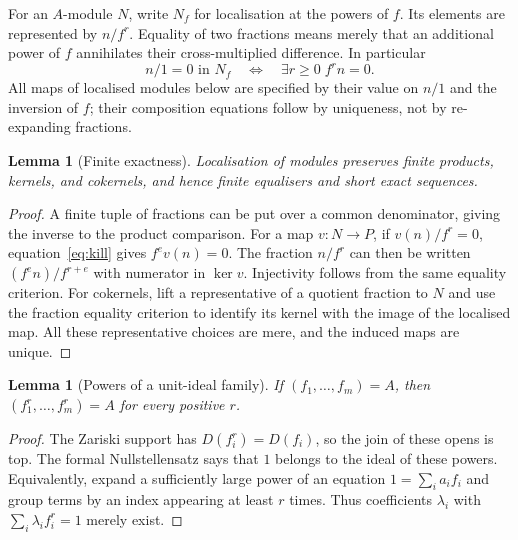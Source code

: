 \documentclass[11pt]{amsart}
\newtheorem{lemma}[theorem]{Lemma}
\theoremstyle{definition}\newtheorem{definition}[theorem]{Definition}
\theoremstyle{remark}\newtheorem{remark}[theorem]{Remark}
\begin{document}
For an $A$-module $N$, write $N_f$ for localisation at the powers of
$f$. Its elements are represented by $n/f^r$. Equality of two fractions
means merely that an additional power of $f$ annihilates their
cross-multiplied difference. In particular
\begin{equation}\label{eq:kill}
 n/1=0\text{ in }N_f\quad\Longleftrightarrow\quad
 \exists r\ge0\;f^r n=0.
\end{equation}
All maps of localised modules below are specified by their value on
$n/1$ and the inversion of $f$; their composition equations follow
by uniqueness, not by re-expanding fractions.

\begin{lemma}[Finite exactness]\label{lem:finite-exact}
Localisation of modules preserves finite products, kernels, and
cokernels, and hence finite equalisers and short exact sequences.
\end{lemma}
\begin{proof}
A finite tuple of fractions can be put over a common denominator,
giving the inverse to the product comparison. For a map $v:N\to P$,
if $v(n)/f^r=0$, equation~\eqref{eq:kill} gives $f^e v(n)=0$.
The fraction $n/f^r$ can then be written
$(f^e n)/f^{r+e}$ with numerator in $\ker v$. Injectivity follows
from the same equality criterion. For cokernels, lift a representative
of a quotient fraction to $N$ and use the fraction equality criterion
to identify its kernel with the image of the localised map. All these
representative choices are mere, and the induced maps are unique.
\end{proof}

\begin{lemma}[Powers of a unit-ideal family]\label{lem:powers}
If $(f_1,\ldots,f_m)=A$, then $(f_1^r,\ldots,f_m^r)=A$ for every
positive $r$.
\end{lemma}
\begin{proof}
The Zariski support has $D(f_i^r)=D(f_i)$, so the join of these opens
is top. The formal Nullstellensatz says that $1$ belongs to the ideal
of these powers. Equivalently, expand a sufficiently large power of
an equation $1=\sum_i a_i f_i$ and group terms by an index appearing
at least $r$ times. Thus coefficients $\lambda_i$ with
$\sum_i\lambda_i f_i^r=1$ merely exist.
\end{proof}
\end{document}
